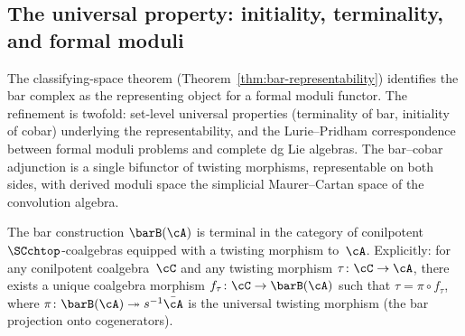 \subsection{The universal property: initiality, terminality, and formal moduli}
\label{subsec:universal-property-twisting}

The classifying-space theorem
(Theorem~\ref{thm:bar-representability}) identifies the bar complex
as the representing object for a formal moduli functor. The
refinement is twofold: set-level universal properties (terminality
of bar, initiality of cobar) underlying the representability, and
the Lurie--Pridham correspondence between formal moduli problems and
complete dg Lie algebras. The bar--cobar adjunction is a single
bifunctor of twisting morphisms, representable on both sides, with
derived moduli space the simplicial Maurer--Cartan space of the
convolution algebra.

\begin{theorem}
\label{thm:bar-terminality}
The bar construction $\barB(\cA)$ is terminal in the category of
conilpotent $\SCchtop$-coalgebras equipped with a twisting morphism
to~$\cA$. Explicitly: for any conilpotent coalgebra~$\cC$ and any
twisting morphism $\tau\colon \cC \to \cA$, there exists a unique
coalgebra morphism $f_\tau\colon \cC \to \barB(\cA)$ such that
$\tau = \pi \circ f_\tau$, where
$\pi\colon \barB(\cA) \twoheadrightarrow s^{-1}\bar{\cA}$ is the
universal twisting morphism \textup{(}the bar projection onto
cogenerators\textup{)}.
\end{theorem}

